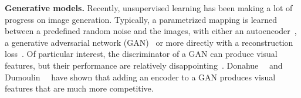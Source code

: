 \noindent\textbf{Generative models.}
Recently, unsupervised learning has been making a lot of progress on image generation.
Typically, a parametrized mapping is learned between a predefined random noise and the images,
with either an autoencoder~\cite{kingma2013auto,bengio2007greedy,huang2007unsupervised,masci2011stacked,vincent2010stacked}, 
a generative adversarial network (GAN)~\cite{goodfellow2014generative} 
or more directly with a reconstruction loss~\cite{bojanowski2017optimizing}.
Of particular interest, 
the discriminator of a GAN can produce visual features, but their performance are relatively disappointing~\cite{donahue2016adversarial}. 
Donahue~\etal~\cite{donahue2016adversarial} and Dumoulin~\etal~\cite{dumoulin2016adversarially} have shown that adding an encoder
to a GAN produces visual features that are much more competitive.

